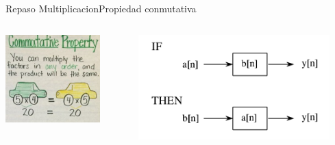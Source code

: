 \begin{frame}{Repaso Multiplicacion}{Propiedad conmutativa}
   \begin{columns}[c]
      \hspace{5pt}
      \begin{column}{0.5\textwidth}
         \centering\includegraphics[width=0.8\textwidth]{5_clase/multi_conmutativa}
      \end{column}
      \hspace{2pt}
      \vrule
      \hspace{2pt}
      \begin{column}{0.5\textwidth}
         \centering\includegraphics[width=0.9\textwidth]{5_clase/conv_conmutativa}
      \end{column}
      \hspace{2pt}
   \end{columns}
   \vfill
\end{frame}
